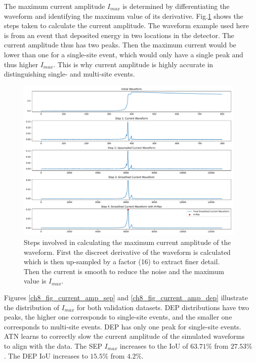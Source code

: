 The maximum current amplitude $I_{max}$ is determined by differentiating the waveform and identifying the maximum value of its derivative. Fig.\ref{fig_ch8_curr_amp_calc} shows the steps taken to calculate the current amplitude. The waveform example used here is from an event that deposited energy in two locations in the detector. The current amplitude thus has two peaks. Then the maximum current would be lower than one for a single-site event, which would only have a single peak and thus higher $I_{max}$. This is why current amplitude is highly accurate in distinguishing single- and multi-site events.


\begin{figure}%
    \centering
    \includegraphics[width=0.99\linewidth, trim={0.4cm 0pc 0.3cm 0pc},clip]{ch8/figs/curr_amp_calc.pdf}
    \caption{Steps involved in calculating the maximum current amplitude of the waveform. First the discreet derivative of the waveform is calculated which is then up-sampled by a factor (16) to extract finer detail. Then the current is smooth to reduce the noise and the maximum value is $I_{max}$.}
    \label{fig_ch8_curr_amp_calc}
\end{figure}

Figures \ref{ch8_fig_current_amp_sep} and \ref{ch8_fig_current_amp_dep} illustrate the distribution of $I_{max}$ for both validation datasets. DEP distributions have two peaks, the higher one corresponds to single-site events, and the smaller one corresponds to multi-site events. DEP has only one peak for single-site events. ATN learns to correctly slow the current amplitude of the simulated waveforms to align with the data. The SEP $I_{max}$ increases to the IoU of $63.71\%$ from $27.53\%$. The DEP IoU increases to $15.5\%$ from $4.2\%$. 
  
